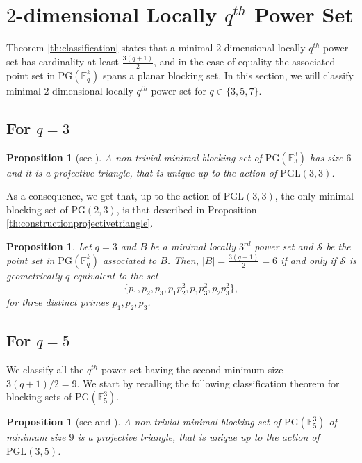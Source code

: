 \documentclass[12pt]{amsart}
\newtheorem{proposition}[theorem]{Proposition}
\newcommand{\F}{{\mathbb F}}
\newcommand{\PG}{\mathrm{PG}}
\begin{document}
\section{$2$-dimensional Locally $q^{th}$ Power Set} \label{section:2dim}
Theorem \ref{th:classification} states that a minimal $2$-dimensional locally $q^{th}$ power set has cardinality at least $\frac{3(q+1)}{2}$, and in the case of equality the associated point set in $\PG(\F_{q}^{k})$ spans a planar blocking set. In this section, we will classify minimal $2$-dimensional locally $q^{th}$ power set for $q \in \{3,5,7\}$.

\subsection{For $q = 3$}
\begin{proposition} [see \textnormal{\cite[Theorem 13.21]{hirschfeld1998projective}}]
A non-trivial minimal blocking set of $\PG(\F_{3}^{3})$ has size $6$ and it is a projective triangle, that is unique up to the action of $\mathrm{PGL}(3,3)$.
\end{proposition}

As a consequence, we get that, up to the action of $\mathrm{PGL}(3,3)$, the only minimal blocking set of $\PG(2,3)$, is that described in Proposition \ref{th:constructionprojectivetriangle}.

\begin{proposition} \label{th:classq3}
    Let $q=3$ and $B$ be a minimal locally $3^{rd}$ power set and $\mathcal{S}$ be the point set in $\PG(\F_{q}^{k})$ associated to $B$. Then, $| B | = \frac{3(q+1)}{2} = 6$ if and only if $\mathcal{S}$ is geometrically $q$-equivalent to the set
    \[\{\overline{p}_1,\overline{p}_2,\overline{p}_3,\overline{p}_1\overline{p}_2^{2},\overline{p}_1\overline{p}_3^{2},\overline{p}_2\overline{p}_3^{2}\},\]
    for three distinct primes $\overline{p}_1,\overline{p}_2,\overline{p}_3$.
\end{proposition}

\subsection{For $q=5$}
We classify all the $q^{th}$ power set having the second minimum size $3(q+1)/2=9$. We start by recalling the following classification theorem for blocking sets of $\PG(\F_{5}^{3})$.
\begin{proposition} [see \textnormal{\cite[Theorem 13.25]{hirschfeld1998projective} and \cite[Section 3]{coolsaet2022classification}}]
A non-trivial minimal blocking set of $\PG(\F_{5}^{3})$ of minimum size $9$ is a projective triangle, that is unique up to the action of $\mathrm{PGL}(3,5)$.
\end{proposition}
\end{document}
